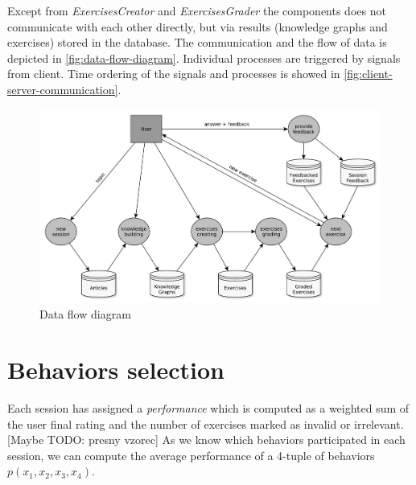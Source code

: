 \documentclass[a4paper, 12pt, twoside]{fithesis2}		%
\renewcommand{\_}{\leavevmode \kern0.07em\vbox{\hrule width0.4em}}
\begin{document}
Except from \textit{ExercisesCreator} and \textit{ExercisesGrader}
the components does not communicate with each other directly,
but via results (knowledge graphs and exercises) stored in the database.
The communication and the flow of data is depicted in \autoref{fig:data-flow-diagram}.
Individual processes are triggered by signals from client.
Time ordering of the signals and processes is showed in \autoref{fig:client-server-communication}.

\begin{figure}[h]
  \centering
  \includegraphics[width=\textwidth]{images/data-flow-diagram.pdf}
  \caption{Data flow diagram}
  \label{fig:data-flow-diagram}
\end{figure}

\section{Behaviors selection}
\label{sec:smartoo-behaviors-selection}

Each session has assigned a \textit{performance} which is computed as a weighted sum of the user final rating and the number of exercises marked as invalid or irrelevant. [Maybe TODO: presny vzorec]
As we know which behaviors participated in each session, we can compute the average performance of a 4-tuple of behaviors $p(x_1, x_2, x_3, x_4)$.
\end{document}
